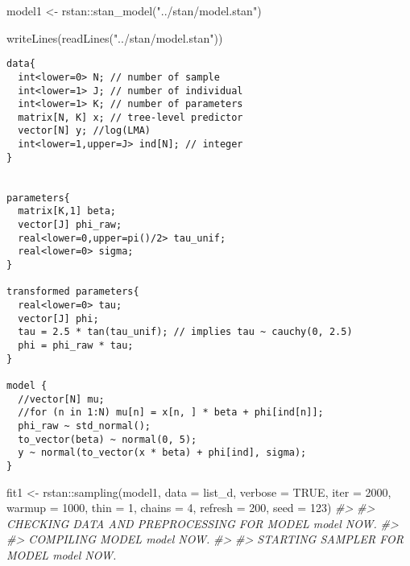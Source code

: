 \documentclass[
]{article}
\newenvironment{Shaded}{\begin{snugshade}}{\end{snugshade}}
\newcommand{\AttributeTok}[1]{\textcolor[rgb]{0.77,0.63,0.00}{#1}}
\newcommand{\CommentTok}[1]{\textcolor[rgb]{0.56,0.35,0.01}{\textit{#1}}}
\newcommand{\ConstantTok}[1]{\textcolor[rgb]{0.00,0.00,0.00}{#1}}
\newcommand{\DecValTok}[1]{\textcolor[rgb]{0.00,0.00,0.81}{#1}}
\newcommand{\FunctionTok}[1]{\textcolor[rgb]{0.00,0.00,0.00}{#1}}
\newcommand{\NormalTok}[1]{#1}
\newcommand{\OtherTok}[1]{\textcolor[rgb]{0.56,0.35,0.01}{#1}}
\newcommand{\SpecialCharTok}[1]{\textcolor[rgb]{0.00,0.00,0.00}{#1}}
\newcommand{\StringTok}[1]{\textcolor[rgb]{0.31,0.60,0.02}{#1}}
\begin{document}
\begin{Shaded}
\begin{Highlighting}[]
\NormalTok{model1 }\OtherTok{\textless{}{-}}\NormalTok{ rstan}\SpecialCharTok{::}\FunctionTok{stan\_model}\NormalTok{(}\StringTok{"../stan/model.stan"}\NormalTok{)}
\end{Highlighting}
\end{Shaded}

\begin{Shaded}
\begin{Highlighting}[]
\FunctionTok{writeLines}\NormalTok{(}\FunctionTok{readLines}\NormalTok{(}\StringTok{"../stan/model.stan"}\NormalTok{))}
\end{Highlighting}
\end{Shaded}

\begin{verbatim}
data{
  int<lower=0> N; // number of sample
  int<lower=1> J; // number of individual
  int<lower=1> K; // number of parameters
  matrix[N, K] x; // tree-level predictor
  vector[N] y; //log(LMA)
  int<lower=1,upper=J> ind[N]; // integer
}


parameters{
  matrix[K,1] beta;
  vector[J] phi_raw;
  real<lower=0,upper=pi()/2> tau_unif;
  real<lower=0> sigma;
}

transformed parameters{
  real<lower=0> tau;
  vector[J] phi;
  tau = 2.5 * tan(tau_unif); // implies tau ~ cauchy(0, 2.5)
  phi = phi_raw * tau;
}

model {
  //vector[N] mu;
  //for (n in 1:N) mu[n] = x[n, ] * beta + phi[ind[n]];
  phi_raw ~ std_normal();
  to_vector(beta) ~ normal(0, 5);
  y ~ normal(to_vector(x * beta) + phi[ind], sigma);
}
\end{verbatim}

\begin{Shaded}
\begin{Highlighting}[]
\NormalTok{fit1 }\OtherTok{\textless{}{-}}\NormalTok{ rstan}\SpecialCharTok{::}\FunctionTok{sampling}\NormalTok{(model1,}
                       \AttributeTok{data =}\NormalTok{ list\_d,}
                       \AttributeTok{verbose =} \ConstantTok{TRUE}\NormalTok{,}
                       \AttributeTok{iter =} \DecValTok{2000}\NormalTok{,}
                       \AttributeTok{warmup =} \DecValTok{1000}\NormalTok{,}
                       \AttributeTok{thin =} \DecValTok{1}\NormalTok{,}
                       \AttributeTok{chains =} \DecValTok{4}\NormalTok{,}
                       \AttributeTok{refresh =} \DecValTok{200}\NormalTok{,}
                       \AttributeTok{seed =} \DecValTok{123}\NormalTok{)}
\CommentTok{\#\textgreater{} }
\CommentTok{\#\textgreater{} CHECKING DATA AND PREPROCESSING FOR MODEL \textquotesingle{}model\textquotesingle{} NOW.}
\CommentTok{\#\textgreater{} }
\CommentTok{\#\textgreater{} COMPILING MODEL \textquotesingle{}model\textquotesingle{} NOW.}
\CommentTok{\#\textgreater{} }
\CommentTok{\#\textgreater{} STARTING SAMPLER FOR MODEL \textquotesingle{}model\textquotesingle{} NOW.}
\end{Highlighting}
\end{Shaded}
\end{document}
